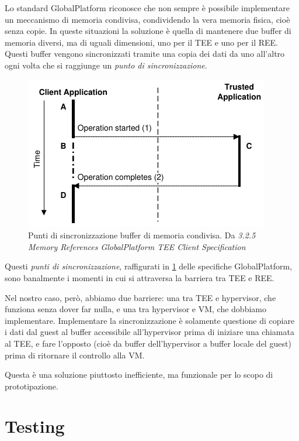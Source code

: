 \documentclass[12pt,italian]{report}
\begin{document}
Lo standard GlobalPlatform riconosce che non sempre è possibile implementare
un  meccanismo di memoria condivisa, condividendo la vera memoria fisica,
cioè senza copie.
In queste situazioni la soluzione è quella di mantenere due buffer di memoria
diversi, ma di uguali dimensioni, uno per il TEE e uno per il REE.
Questi buffer vengono sincronizzati tramite una copia dei dati da uno all'altro
ogni volta che si raggiunge un \textit{punto di sincronizzazione}.

\begin{figure}[h]
    \centering
    \includegraphics{immagini/tp-synchronization-points}
    \caption{
        Punti di sincronizzazione buffer di memoria condivisa.
        Da \textit{
            3.2.5 Memory References GlobalPlatform TEE Client Specification
        }
    }
    \label{fig:gp-punti-sincronizzazione}
\end{figure}

Questi \textit{punti di sincronizzazione}, raffigurati in
\ref{fig:gp-punti-sincronizzazione} delle specifiche GlobalPlatform,
sono banalmente i momenti in cui si attraversa la barriera tra TEE e REE.

Nel nostro caso, però, abbiamo due barriere: una tra TEE e hypervisor,
che funziona
senza dover far nulla, e una tra hypervisor e VM, che dobbiamo implementare.
Implementare la sincronizzazione è solamente questione di copiare i dati dal
guest al buffer accessibile all'hypervisor prima di iniziare una chiamata
al TEE, e fare l'opposto (cioè da buffer dell'hypervisor a buffer locale
del guest) prima di ritornare il controllo alla VM.

Questa è una soluzione piuttosto inefficiente, ma funzionale per lo scopo di
prototipazione.

\chapter{Testing}
\label{chap:testing}
\end{document}
